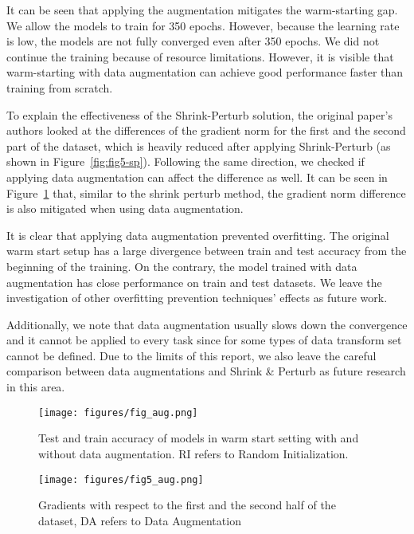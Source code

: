 It can be seen that applying the augmentation mitigates the warm-starting gap. We allow the models to train for 350 epochs. However, because the learning rate is low, the models are not fully converged even after 350 epochs. We did not continue the training because of resource limitations. However, it is visible that warm-starting with data augmentation can achieve good performance faster than training from scratch. 

To explain the effectiveness of the Shrink-Perturb solution, the original paper's authors looked at the differences of the gradient norm for the first and the second part of the dataset, which is heavily reduced after applying Shrink-Perturb (as shown in Figure~\ref{fig:fig5-sp}). Following the same direction, we checked if applying data augmentation can affect the difference as well. It can be seen in Figure~\ref{fig:fig_aug_grad} that, similar to the shrink perturb method, the gradient norm difference is also mitigated when using data augmentation. 

It is clear that applying data augmentation prevented overfitting. The original warm start setup has a large divergence between train and test accuracy from the beginning of the training. On the contrary, the model trained with data augmentation has close performance on train and test datasets. We leave the investigation of other overfitting prevention techniques' effects as future work.

Additionally, we note that data augmentation usually slows down the convergence and it cannot be applied to every task since for some types of data transform set cannot be defined. Due to the limits of this report, we also leave the careful comparison between data augmentations and Shrink \& Perturb as future research in this area.

%
%
%

\begin{figure}
    \begin{minipage}[t]{.60\linewidth}
    \centering
    \texttt{[image: figures/fig\_aug.png]}
    \caption{Test and train accuracy of models in warm start setting with and without data augmentation. RI refers to Random Initialization.}
    \label{fig:fig_aug}
    \end{minipage}
    \hfill
    \begin{minipage}[t]{.37\linewidth}
    \centering
    \texttt{[image: figures/fig5\_aug.png]}
    \caption{Gradients with respect to the first and the second half of the dataset, DA refers to Data Augmentation}
    \label{fig:fig_aug_grad}
    \end{minipage}

\end{figure}


